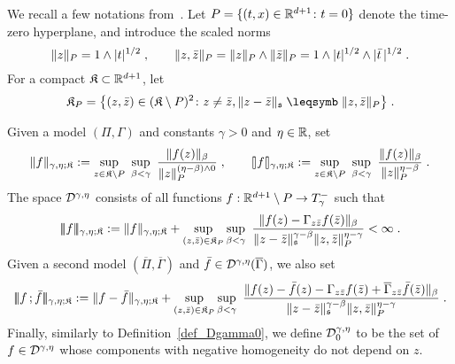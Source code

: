 \documentclass[reqno,11pt]{article}
\def\normDgamma#1{|\!|\!|#1|\!|\!|}
\def\seminormff#1#2{|\!|\!|#1\,\mathord{;}\,#2|\!|\!|}
\def\seminormbox#1{[\hspace{-.1em}]#1[\hspace{-.1em}]}
\def\fraks{\mathfrak{s}}
\def\fraK{\mathfrak{K}}
\def\Gammabar{\overline\Gamma}
\def\Pibar{\overline\Pi}
\begin{document}
We recall a few notations from~\cite[Section~6]{Hairer2014}. Let
$P=\{(t,x)\in\mathbb{R}^{d+1}\colon t=0\}$ denote the time-zero hyperplane, and
introduce the scaled norms 
\begin{equation}
 \label{eq:normP}
 \norm{z}_P = 1\wedge \abs{t}^{1/2}\;, \qquad
 \norm{z,\bar z}_P = \norm{z}_P \wedge \norm{\bar z}_P
 = 1 \wedge \abs{t}^{1/2} \wedge \abs{\bar t\,}^{1/2}\;.
\end{equation} 
For a compact $\fraK \subset \R^{d+1}$, let 
\begin{equation}
 \label{eq:KP} 
 \fraK_P = \bigsetsuch{(z,\bar z)\in(\fraK\setminus P)^2}
 {z\neq\bar z, \norm{z-\bar z}_\fraks \leqs \norm{z,\bar z}_P}\;.
\end{equation} 

\begin{definition}
\label{def:D_gamma_eta} 
Given a model $(\Pi,\Gamma)$ and constants $\gamma>0$ and $\eta\in\mathbb{R}$, set 
\begin{equation}
 \label{eq:norm_gamma_eta1}
 \norm{f}_{\gamma,\eta;\fraK} 
 := \sup_{z\in\fraK\setminus P}~ \sup_{\beta<\gamma}~
 \frac{\norm{f(z)}_\beta}{\norm{z}_P^{(\eta-\beta)\wedge0}}\;, 
 \qquad
 \seminormbox{f}_{\gamma,\eta;\fraK} 
 := \sup_{z\in\fraK\setminus P}~ \sup_{\beta<\gamma}~
 \frac{\norm{f(z)}_\beta} {\norm{z}_P^{\eta-\beta}}\;.
\end{equation} 
The space ${\mathcal D}^{\gamma,\eta}$ consists of all functions $f:\mathbb{R}^{d+1}\setminus
P\to T_\gamma^-$ such that 
\begin{equation}
 \label{eq:norm_gamma_eta2}
 \normDgamma{f}_{\gamma,\eta;\fraK} := 
 \norm{f}_{\gamma,\eta;\fraK}  
 + \sup_{(z,\bar z)\in\fraK_P}
 \sup_{\beta<\gamma}~\frac{\norm{f(z)-\Gamma_{z\bar z}f(\bar z)}_\beta}
 {\norm{z-\bar z}^{\gamma-\beta}_{\fraks}\norm{z,\bar z}_P^{\eta-\gamma}}
< \infty\;.
\end{equation}
Given a second model $(\Pibar,\Gammabar)$ and $\bar
f\in\cD^{\gamma,\eta}(\Gammabar)$, we also set 
\begin{equation}
 \label{eq:norm_gamma_eta3}
 \seminormff{f}{\bar f}_{\gamma,\eta;\fraK}
 := \norm{f-\bar f}_{\gamma,\eta;\fraK} 
 + \sup_{(z,\bar z)\in\fraK_P}
 \sup_{\beta < \gamma}
 ~\frac{\norm{f(z) - \bar f(z) - \Gamma_{z\bar z}f(\bar z) +
\Gammabar_{z\bar z}\bar f(\bar z)}_\beta}{\norm{z-\bar
z}_{\fraks}^{\gamma-\beta}\norm{z,\bar z}_P^{\eta-\gamma}}\;.
\end{equation}
Finally, similarly to Definition~\ref{def_Dgamma0}, we define
${\mathcal D}_0^{\gamma,\eta}$ to be the set of $f\in{\mathcal D}^{\gamma,\eta}$ whose components
with negative homogeneity do not depend on $z$. 
\end{definition}
\end{document}
